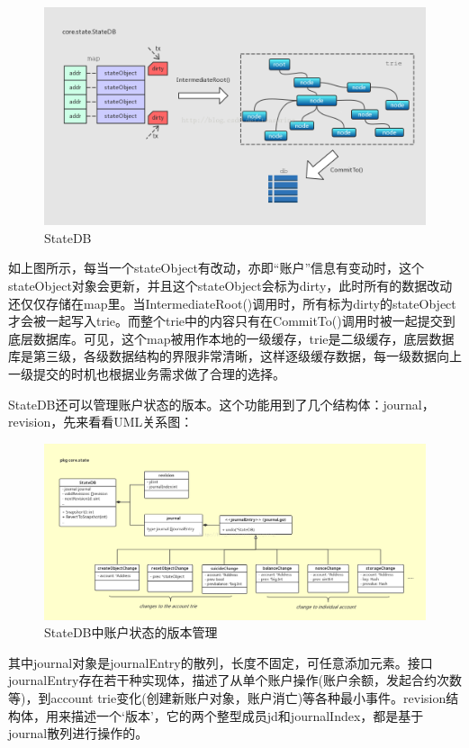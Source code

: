 \documentclass[UTF8]{ctexart}
\begin{document}
\begin{figure}
	\centering
	\includegraphics[scale=0.35]{statedb.png}
	\caption{StateDB}
	\label{statedb}
\end{figure}

如上图所示，每当一个stateObject有改动，亦即“账户”信息有变动时，这个stateObject对象会更新，并且这个stateObject会标为dirty，此时所有的数据改动还仅仅存储在map里。当IntermediateRoot()调用时，所有标为dirty的stateObject才会被一起写入trie。而整个trie中的内容只有在CommitTo()调用时被一起提交到底层数据库。可见，这个map被用作本地的一级缓存，trie是二级缓存，底层数据库是第三级，各级数据结构的界限非常清晰，这样逐级缓存数据，每一级数据向上一级提交的时机也根据业务需求做了合理的选择。


StateDB还可以管理账户状态的版本。这个功能用到了几个结构体：journal，revision，先来看看UML关系图：

\begin{figure}
	\centering
	\includegraphics[scale=0.28]{statedb2.png}
	\caption{StateDB中账户状态的版本管理}
	\label{statedb2}
\end{figure}

其中journal对象是journalEntry的散列，长度不固定，可任意添加元素。接口journalEntry存在若干种实现体，描述了从单个账户操作(账户余额，发起合约次数等)，到account trie变化(创建新账户对象，账户消亡)等各种最小事件。revision结构体，用来描述一个‘版本’，它的两个整型成员jd和journalIndex，都是基于journal散列进行操作的。
\end{document}

